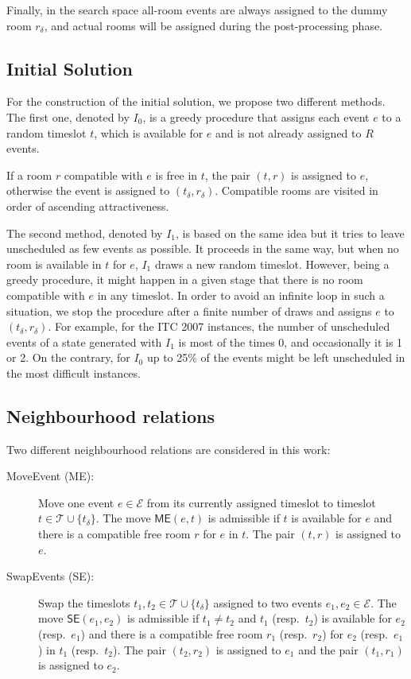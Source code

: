\documentclass[authoryear,preprint,a4paper,12pt]{elsarticle}
\begin{document}
Finally, in the search space all-room events are always assigned to
the dummy room $r_\delta$, and actual rooms will be assigned during
the post-processing phase.

\subsection{Initial Solution}

For the construction of the initial solution, we propose two different
methods.  The first one, denoted by $I_0$, is a greedy procedure
that assigns each event $e$ to a random timeslot $t$, which is available
for $e$ and is not already assigned to $R$ events.

If a room $r$ compatible with $e$ is free in $t$, the pair $(t,r)$ is
assigned to $e$, otherwise the event is assigned to
$(t_\delta,r_\delta)$. Compatible rooms are visited in order of
ascending attractiveness. 

The second method, denoted by $I_1$, is based on the same idea but
it tries to leave unscheduled as few events as possible.  It proceeds
in the same way, but when no room is available in $t$ for
$e$, $I_1$ draws a new random timeslot. However, being a greedy
procedure, it might happen in a given stage that there
is no room compatible with $e$ in any timeslot. In order to avoid an infinite loop in such a situation, we stop the procedure after a finite number of draws and
assigns $e$ to $(t_\delta,r_\delta)$. 
For example, for the ITC 2007 instances, the number of unscheduled
events of a state generated with $I_1$ is most of the times 0, and
occasionally it is 1 or 2. On the contrary, for $I_0$ up
to 25\% of the events might be left unscheduled in the most difficult
instances.

\subsection{Neighbourhood relations}

Two different neighbourhood relations are considered in this work:

\begin{description}
\item[\textsf{MoveEvent (ME)}:] Move one event $e\in \mathcal{E}$ from its
  currently assigned timeslot to timeslot $t\in \mathcal{T}\cup \{t_\delta\}$.
  The move $\mathsf{ME}(e,t)$ is admissible if $t$ is available for
  $e$ and there is a compatible free room $r$ for $e$ in $t$.
The pair $(t,r)$ is assigned to $e$.

\item[\textsf{SwapEvents (SE)}:] Swap the timeslots $t_1,t_2\in
  \mathcal{T}\cup \{t_\delta\}$ assigned to two events $e_1,e_2 \in
  \mathcal{E}$.  The move $\mathsf{SE}(e_1,e_2)$ is admissible if $t_1
  \neq t_2$ and $t_1$ (resp.\ $t_2$) is available for $e_2$ (resp.\
  $e_1$) and there is a compatible free room $r_1$ (resp.\ $r_2$) for
  $e_2$ (resp.\ $e_1$) in $t_1$ (resp.\ $t_2$). The pair $(t_2,r_2)$
  is assigned to $e_1$ and the pair $(t_1,r_1)$ is assigned to $e_2$.
\end{description}
\end{document}
